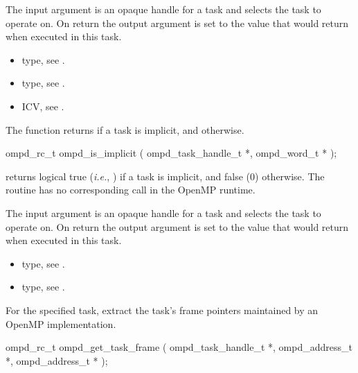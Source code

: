 \argdesc
The input argument  is an opaque handle for a task and selects the task to operate on.
On return the output argument  is set to the value that  would return when
executed in this task.
%

\crossreferences
\begin{itemize}
	\item {} type, see .
	\item {} type, see .
	\item {} ICV, see .
\end{itemize}

\label{ompd:ompd_is_implicit}
\summary
The  function returns  if a task is implicit, and  otherwise.

\format
\cspecificstart
\begin{ompSyntax}
ompd_rc_t ompd_is_implicit (
  ompd_task_handle_t *,
  ompd_word_t *
);
\end{ompSyntax}
\cspecificend

\descr
{} returns logical true (\textit{i.e.}, )
if a task is implicit, and false (0) otherwise.
The routine has no corresponding call in the OpenMP runtime.

\argdesc
The input argument  is an opaque handle for a task and selects the task to operate on.
On return the output argument  is set to the value that  would return when
executed in this task.

\crossreferences
\begin{itemize}
	\item {} type, see .
	\item {} type, see .
\end{itemize}



%
\label{ompd:ompd_get_task_frame}
\summary
For the specified task, extract the task's frame pointers maintained by an OpenMP implementation.

\format
\cspecificstart
\begin{ompSyntax}
ompd_rc_t ompd_get_task_frame (
  ompd_task_handle_t *,
  ompd_address_t *,
  ompd_address_t *
);
\end{ompSyntax}
\cspecificend



